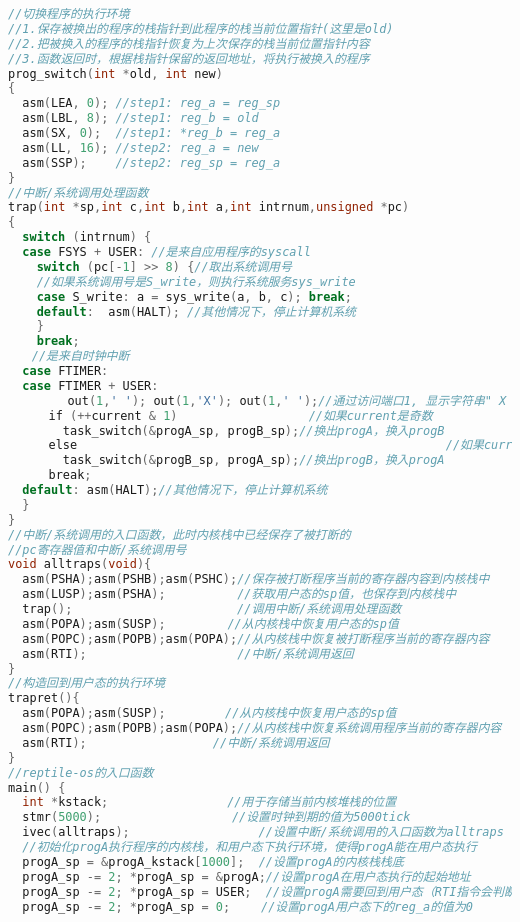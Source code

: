 \begin{lstlisting}[language={C}]
//切换程序的执行环境
//1.保存被换出的程序的栈指针到此程序的栈当前位置指针(这里是old)
//2.把被换入的程序的栈指针恢复为上次保存的栈当前位置指针内容
//3.函数返回时，根据栈指针保留的返回地址，将执行被换入的程序
prog_switch(int *old, int new) 
{
  asm(LEA, 0); //step1: reg_a = reg_sp　　
  asm(LBL, 8); //step1: reg_b = old
  asm(SX, 0);  //step1: *reg_b = reg_a
  asm(LL, 16); //step2: reg_a = new
  asm(SSP);    //step2: reg_sp = reg_a
}
//中断/系统调用处理函数
trap(int *sp,int c,int b,int a,int intrnum,unsigned *pc)
{
  switch (intrnum) {
  case FSYS + USER: //是来自应用程序的syscall
    switch (pc[-1] >> 8) {//取出系统调用号
    //如果系统调用号是S_write，则执行系统服务sys_write
    case S_write: a = sys_write(a, b, c); break;
    default:  asm(HALT); //其他情况下，停止计算机系统
    }
    break;
　　//是来自时钟中断   
  case FTIMER:  
  case FTIMER + USER:　
　　　　　out(1,' '); out(1,'X'); out(1,' ');//通过访问端口1, 显示字符串" X "
    　if (++current & 1)　　               //如果current是奇数
     　 task_switch(&progA_sp, progB_sp);//换出progA，换入progB
    　else　　　　　　　　　　　　　　　　　　　　　　　　　　　　　　　//如果current是偶数
     　 task_switch(&progB_sp, progA_sp);//换出progB，换入progA
    　break;
  default: asm(HALT);//其他情况下，停止计算机系统
  }
}
//中断/系统调用的入口函数，此时内核栈中已经保存了被打断的
//pc寄存器值和中断/系统调用号
void alltraps(void){
  asm(PSHA);asm(PSHB);asm(PSHC);//保存被打断程序当前的寄存器内容到内核栈中
  asm(LUSP);asm(PSHA);          //获取用户态的sp值，也保存到内核栈中
  trap();                       //调用中断/系统调用处理函数
  asm(POPA);asm(SUSP); 　　　　 //从内核栈中恢复用户态的sp值
  asm(POPC);asm(POPB);asm(POPA);//从内核栈中恢复被打断程序当前的寄存器内容
  asm(RTI);                     //中断/系统调用返回
}
//构造回到用户态的执行环境
trapret(){
  asm(POPA);asm(SUSP);　　　　　//从内核栈中恢复用户态的sp值
  asm(POPC);asm(POPB);asm(POPA);//从内核栈中恢复系统调用程序当前的寄存器内容
  asm(RTI);　　　　　　　　　　 //中断/系统调用返回
}
//reptile-os的入口函数
main() {
  int *kstack;　　　　　　　　　　//用于存储当前内核堆栈的位置　　　　　　　　　　　　　　 
  stmr(5000);　　　　　　　　　　　//设置时钟到期的值为5000tick
  ivec(alltraps);                  //设置中断/系统调用的入口函数为alltraps
  //初始化progA执行程序的内核栈，和用户态下执行环境，使得progA能在用户态执行
  progA_sp = &progA_kstack[1000];  //设置progA的内核栈栈底
  progA_sp -= 2; *progA_sp = &progA;//设置progA在用户态执行的起始地址
  progA_sp -= 2; *progA_sp = USER;  //设置progA需要回到用户态（RTI指令会判断）
  progA_sp -= 2; *progA_sp = 0; 　　//设置progA用户态下的reg_a的值为0

\end{lstlisting}
